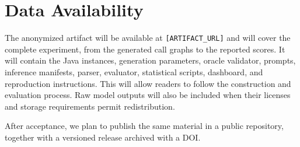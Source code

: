 \section*{Data Availability}

The anonymized artifact will be available at \texttt{[ARTIFACT\_URL]} and will cover the complete experiment, from the generated call graphs to the reported scores. It will contain the Java instances, generation parameters, oracle validator, prompts, inference manifests, parser, evaluator, statistical scripts, dashboard, and reproduction instructions. This will allow readers to follow the construction and evaluation process. Raw model outputs will also be included when their licenses and storage requirements permit redistribution. 

After acceptance, we plan to publish the same material in a public repository, together with a versioned release archived with a DOI. 
